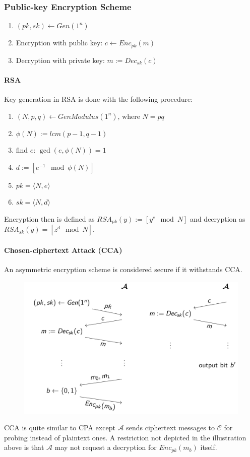 \subsubsection{Public-key Encryption Scheme}
\begin{enumerate}
  \item $(pk,sk) \leftarrow Gen(1^n)$
  \item Encryption with public key: $c \leftarrow Enc_{pk}(m)$
  \item Decryption with private key: $m := Dec_{sk}(c)$
\end{enumerate}

\paragraph{RSA}
Key generation in RSA is done with the following procedure:
\begin{enumerate}
  \item $(N,p,q) \leftarrow GenModulus(1^n)\text{, where }N = pq$
  \item $\phi(N) := lcm(p-1,q-1)$
  \item find $e$: $\gcd(e,\phi(N)) = 1$
  \item $d := [e^{-1} \mod \phi(N)]$
  \item $pk = \langle N,e \rangle$
  \item $sk = \langle N,d \rangle$
\end{enumerate}

Encryption then is defined as $RSA_{pk}(y) := [y^e \mod N]$ and decryption as $RSA_{sk}(y) = [z^d \mod N]$.

\paragraph{Chosen-ciphertext Attack (CCA)}
An asymmetric encryption scheme is considered secure if it withstands CCA\@.
\begin{figure}[H]
  \centering
  \includegraphics[width=.8\textwidth]{figures/cca.png}
\end{figure}
CCA is quite similar to CPA except $\mathcal{A}$ sends ciphertext messages to $\mathcal{C}$ for probing instead of plaintext ones.
A restriction not depicted in the illustration above is that $\mathcal{A}$ may not request a decryption for $Enc_{pk}(m_b)$ itself.
\newpage

